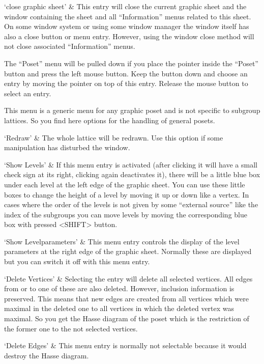 `close graphic sheet' &
This entry will close the current graphic sheet and the window containing
the sheet  and all  ``Information'' menus related  to  this sheet.  On some
window system or using  some window manager the window  itself has also a
close button or menu entry.  However,  using the window close method will
not close associated ``Information'' menus.
\enditems


The ``Poset'' menu will be pulled down if you place the pointer inside the
``Poset'' button and  press the left mouse  button.  Keep  the button down
and choose an entry by moving the pointer on top of  this entry.  Release
the mouse button to select an entry.

This menu is a generic menu for any graphic poset and is not specific to
subgroup lattices. So you find here options for the handling of general
posets. 

\beginitems
`Redraw' &
  The whole lattice will be redrawn. Use this option if some manipulation
  has disturbed the window.
  
`Show Levels' & 
  If this menu entry is activated (after clicking it will have a small
  check sign at its right, clicking again deactivates it), there will be a
  little blue box under each level at the left edge of the graphic
  sheet. You can use these little boxes to change the height of a level by
  moving it up or down like a vertex. In cases where the order of the
  levels is not given by some ``external source'' like the index of the
  subgroups you can move levels by moving the corresponding blue box with
  pressed <SHIFT> button.
  
`Show Levelparameters' &
  This menu entry controls the display of the level parameters at the right 
  edge of the graphic sheet. Normally these are displayed but you can
  switch it off with this menu entry.

`Delete Vertices' &
  Selecting the entry will delete all selected vertices. All edges from or
  to one of these are also deleted. However, inclusion information is
  preserved. This means that new edges are created from all vertices which
  were maximal in the deleted one to all vertices in which the deleted
  vertex was maximal. So you get the Hasse diagram of the poset which is
  the restriction of the former one to the not selected vertices.

`Delete Edges' &
  This menu entry is normally not selectable because it would destroy the
  Hasse diagram.

